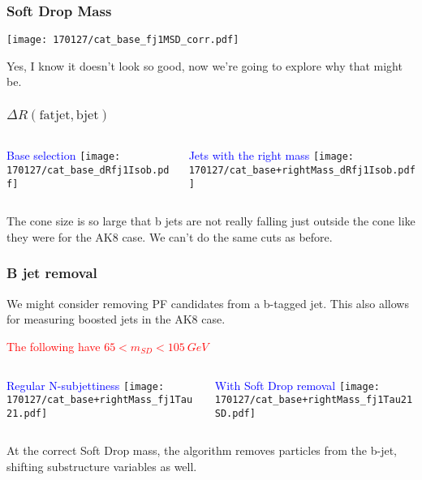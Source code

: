 \documentclass{beamer}
\begin{document}
\begin{frame}
  \frametitle{Soft Drop Mass}

  \begin{center}
  \texttt{[image: 170127/cat\_base\_fj1MSD\_corr.pdf]}
  \end{center}

  Yes, I know it doesn't look so good, now we're going to explore why that might be.

\end{frame}

\begin{frame}
  \frametitle{$\Delta R\mathrm{(fat jet, b jet)}$}

  \begin{columns}
    \begin{column}{0.5\linewidth}
      \centering
      \textcolor{blue}{Base selection}
      \texttt{[image: 170127/cat\_base\_dRfj1Isob.pdf]}
    \end{column}
    \begin{column}{0.5\linewidth}
      \centering
      \textcolor{blue}{Jets with the right mass}
      \texttt{[image: 170127/cat\_base+rightMass\_dRfj1Isob.pdf]}
    \end{column}
  \end{columns}

  The cone size is so large that b jets are not really falling just outside the cone
  like they were for the AK8 case.
  We can't do the same cuts as before.

\end{frame}

\begin{frame}
  \frametitle{B jet removal}

  We might consider removing PF candidates from a b-tagged jet.
  This also allows for measuring boosted jets in the AK8 case.

  \textcolor{red}{The following have $65 < m_{SD} < \SI{105}{GeV}$}

  \begin{columns}
    \begin{column}{0.5\linewidth}
      \centering
      \textcolor{blue}{Regular N-subjettiness}
      \texttt{[image: 170127/cat\_base+rightMass\_fj1Tau21.pdf]}
    \end{column}
    \begin{column}{0.5\linewidth}
      \centering
      \textcolor{blue}{With Soft Drop removal}
      \texttt{[image: 170127/cat\_base+rightMass\_fj1Tau21SD.pdf]}
    \end{column}
  \end{columns}

  At the correct Soft Drop mass, the algorithm removes particles from the b-jet, shifting substructure variables as well.

\end{frame}
\end{document}
